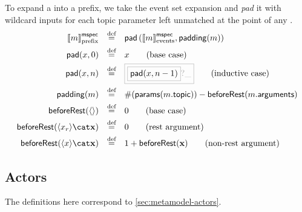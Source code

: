 \newcommand{\paramsOf}[1]{\funcname{params}(#1)}
\newcommand{\beforeRest}[1]{\funcname{beforeRest}(#1)}

\begin{definition}

To expand a \mmessagespec{} into a prefix, we take the event set expansion and
 \emph{pad} it with wildcard inputs for each topic parameter
left unmatched at the point of any \mrestargument.
%
\begin{align*}
	\pmspecsema{\amspec}
\quad\defeq\quad&
	\funcname{pad}\left(\emspecsema{\amspec}, \funcname{padding}(\amspec)\right)
\\
	\funcname{pad}(x, 0)
\quad\defeq\quad&
	x
\tag{base case}
\\
	\funcname{pad}(x, n)
\quad\defeq\quad&
\tlang{
	\olang{\funcname{pad}(x, n-1)}?\_
}
\tag{inductive case}
\\
	\funcname{padding}(\amspec)
\quad\defeq\quad&
	\#(\paramsOf{\field{\amspec}{topic}}) - \beforeRest{\field{\amspec}{arguments}}
\\
	\beforeRest{\langle\rangle}
\quad\defeq\quad&
	0
\tag{base case}
\\
	\beforeRest{\langle \arestarg \rangle \cat \anarglist}
\quad\defeq\quad&
	0
\tag{rest argument}
\\
	\beforeRest{\langle \anarg \rangle \cat \anarglist}
\quad\defeq\quad&
	1 + \beforeRest{\anarglist}
\tag{non-rest argument}
\end{align*}
\end{definition}

\subsection{Actors}\label{ssec:semantics-tockcsp-actors}

The definitions here correspond to \cref{sec:metamodel-actors}.


